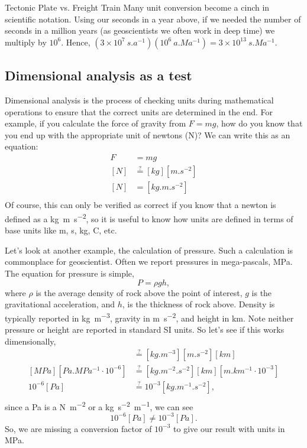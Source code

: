 \begin{activity}{Tectonic Plate vs. Freight Train}
Many unit conversion become a cinch in scientific notation.  Using our seconds in a year above, if we needed the number of seconds in a million years (as geoscientists we often work in deep time) we multiply by $10^6$.  Hence, $(3 \times 10^{7}~\si{s.a^{-1}}) (10^6~\si{a.Ma^{-1}}) = 3 \times 10^{13}~\si{s.Ma^{-1}}$.

\subsection{Dimensional analysis as a test}
Dimensional analysis is the process of checking units during mathematical operations to ensure that the correct units are determined in the end.  For example, if you calculate the force of gravity from $F = mg$, how do you know that you end up with the appropriate unit of newtons (N)?  We can write this as an equation:
\begin{align*}
    F &= m g \\
    [\si{N}] &\overset{?}{=} [\si{kg}] [\si{m.s^{-2}}] \\
    [\si{N}] &= [\si{kg.m.s^{-2}}] \\
\end{align*}
Of course, this can only be verified as correct if you know that a newton is defined as a \si{kg.m.s^{-2}}, so it is useful to know how units are defined in terms of base units like \si{m}, \si{s}, \si{kg}, \si{C}, etc.

Let's look at another example, the calculation of pressure.  Such a calculation is commonplace for geoscientist.  Often we report pressures in mega-pascals, \si{MPa}.  The equation for pressure is simple,
\[
    P = \rho g h\! ,
\]
where $\rho$ is the average density of rock above the point of interest, $g$ is the gravitational acceleration, and $h$, is the thickness of rock above. Density is typically reported in \si{kg.m^{-3}}, gravity in \si{m.s^{-2}}, and height in \si{km}.  Note neither pressure or height are reported in standard SI units.  So let's see if this works dimensionally,
\begin{align*}
    [\si{MPa}] &\overset{?}{=} [\si{kg.m^{-3}}][\si{m.s^{-2}}][\si{km}] \\
    [\si{MPa}][\si{Pa.MPa^{-1}} \cdot 10^{-6}] &\overset{?}{=} [\si{kg.m^{-2}.s^{-2}}][\si{km}][\si{m.km^{-1}} \cdot 10^{-3}] \\
    10^{-6} [\si{Pa}] &\overset{?}{=} 10^{-3} [\si{kg.m^{-1}.s^{-2}}] , \\
\end{align*}
since a \si{Pa} is a \si{N.m^{-2}} or a \si{kg.s^{-2}.m^{-1}}, we can see
\[
    10^{-6}[\si{Pa}] \neq 10^{-3} [\si{Pa}]\! .
\]
So, we are missing a conversion factor of $10^{-3}$ to give our result with units in \si{MPa}.


\end{activity}
